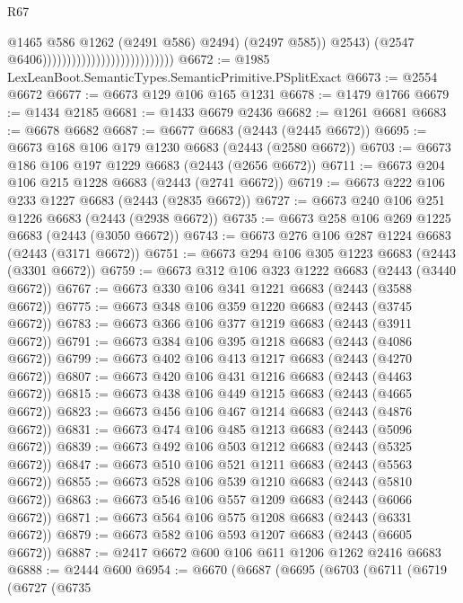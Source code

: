 \begin{lexlean}{R67}
\begin{coremodule}
                                                              @1465
                                                              @586
                                                              @1262
                                                              (@2491 @586)
                                                              @2494)
                                                            (@2497 @585))
                                                          @2543)
                                                        (@2547 @6406)))))))))))))))))))))))))))
@6672 := @1985 LexLeanBoot.SemanticTypes.SemanticPrimitive.PSplitExact
@6673 := @2554 @6672
@6677 := @6673 @129 @106 @165 @1231
@6678 := @1479 @1766
@6679 := @1434 @2185
@6681 := @1433 @6679 @2436
@6682 := @1261 @6681
@6683 := @6678 @6682
@6687 := @6677 @6683 (@2443 (@2445 @6672))
@6695 := @6673 @168 @106 @179 @1230 @6683 (@2443 (@2580 @6672))
@6703 := @6673 @186 @106 @197 @1229 @6683 (@2443 (@2656 @6672))
@6711 := @6673 @204 @106 @215 @1228 @6683 (@2443 (@2741 @6672))
@6719 := @6673 @222 @106 @233 @1227 @6683 (@2443 (@2835 @6672))
@6727 := @6673 @240 @106 @251 @1226 @6683 (@2443 (@2938 @6672))
@6735 := @6673 @258 @106 @269 @1225 @6683 (@2443 (@3050 @6672))
@6743 := @6673 @276 @106 @287 @1224 @6683 (@2443 (@3171 @6672))
@6751 := @6673 @294 @106 @305 @1223 @6683 (@2443 (@3301 @6672))
@6759 := @6673 @312 @106 @323 @1222 @6683 (@2443 (@3440 @6672))
@6767 := @6673 @330 @106 @341 @1221 @6683 (@2443 (@3588 @6672))
@6775 := @6673 @348 @106 @359 @1220 @6683 (@2443 (@3745 @6672))
@6783 := @6673 @366 @106 @377 @1219 @6683 (@2443 (@3911 @6672))
@6791 := @6673 @384 @106 @395 @1218 @6683 (@2443 (@4086 @6672))
@6799 := @6673 @402 @106 @413 @1217 @6683 (@2443 (@4270 @6672))
@6807 := @6673 @420 @106 @431 @1216 @6683 (@2443 (@4463 @6672))
@6815 := @6673 @438 @106 @449 @1215 @6683 (@2443 (@4665 @6672))
@6823 := @6673 @456 @106 @467 @1214 @6683 (@2443 (@4876 @6672))
@6831 := @6673 @474 @106 @485 @1213 @6683 (@2443 (@5096 @6672))
@6839 := @6673 @492 @106 @503 @1212 @6683 (@2443 (@5325 @6672))
@6847 := @6673 @510 @106 @521 @1211 @6683 (@2443 (@5563 @6672))
@6855 := @6673 @528 @106 @539 @1210 @6683 (@2443 (@5810 @6672))
@6863 := @6673 @546 @106 @557 @1209 @6683 (@2443 (@6066 @6672))
@6871 := @6673 @564 @106 @575 @1208 @6683 (@2443 (@6331 @6672))
@6879 := @6673 @582 @106 @593 @1207 @6683 (@2443 (@6605 @6672))
@6887 := @2417 @6672 @600 @106 @611 @1206 @1262 @2416 @6683
@6888 := @2444 @600
@6954 := @6670
    (@6687
      (@6695
        (@6703
          (@6711
            (@6719
              (@6727
                (@6735

\end{coremodule}
\end{lexlean}

